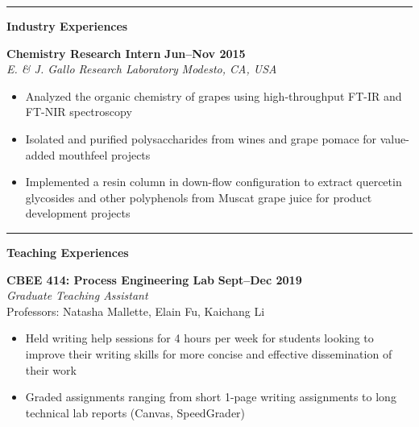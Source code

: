 \documentclass[10pt]{letter}
\begin{document}
\par\noindent\rule{\textwidth}{0.5pt}


\begin{center}
\textbf{\large Industry Experiences} \\
\end{center}
\vspace{-5pt}
\textbf{Chemistry Research Intern}
\hfill
\textbf{Jun--Nov 2015} \\
\textit{E. \& J. Gallo Research Laboratory}
\hfill
\textit{Modesto, CA, USA} \\
\vspace{2pt}
{\small
\begin{itemize}
    \item Analyzed the organic chemistry of grapes using high-throughput FT-IR and FT-NIR spectroscopy
    \item Isolated and purified polysaccharides from wines and grape pomace for value-added mouthfeel projects
    \item Implemented a resin column in down-flow configuration to extract quercetin glycosides and other polyphenols from Muscat grape juice for product development projects
\end{itemize}}
\vspace{-5pt}

\par\noindent\rule{\textwidth}{0.5pt}


\begin{center}
\textbf{\large Teaching Experiences} \\
\end{center}
\vspace{-5pt}
\textbf{CBEE 414: Process Engineering Lab}
\hfill
\textbf{Sept--Dec 2019} \\
\textit{Graduate Teaching Assistant} \\
Professors: Natasha Mallette, Elain Fu, Kaichang Li \\
\vspace{2pt}
{\small
\begin{itemize}
    \item Held writing help sessions for 4 hours per week for students looking to improve their writing skills for more concise and effective dissemination of their work
    \item Graded assignments ranging from short 1-page writing assignments to long technical lab reports (Canvas, SpeedGrader)
\end{itemize}}
\vspace{-5pt}
\end{document}
